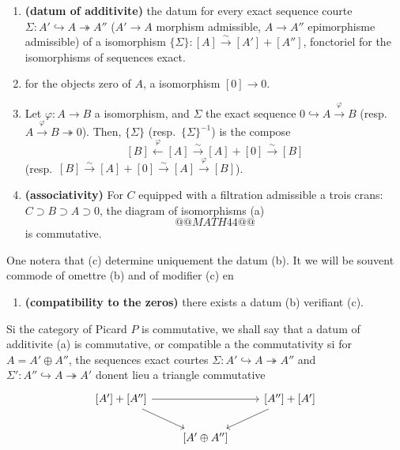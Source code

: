 \documentclass[12pt,a4paper]{article}
\theoremstyle{plain}
\theoremstyle{definition}
\begin{document}
\begin{enumerate}[label=(\alph*)]
\item \textbf{(datum of additivite)} the datum for every exact sequence courte $\Sigma: A' \hookrightarrow
A \twoheadrightarrow A''$ ($A' \to A$ morphism admissible, $A \to A''$ epimorphisme admissible) of a
isomorphism $\{\Sigma\}: [A] \xrightarrow{\sim} [A'] + [A'']$, fonctoriel for the isomorphisms of sequences
exact.

\item for the objects zero of $A$, a isomorphism $[0] \to 0$.

\item Let $\varphi: A \to B$ a isomorphism, and $\Sigma$ the exact sequence $0 \hookrightarrow A \xrightarrow{\varphi} B$ (resp.\ $A \xrightarrow{\varphi} B \twoheadrightarrow 0$). Then, $\{\Sigma\}$ (resp.\ $\{\Sigma\}^{-1}$) is the compose
\[
[B] \xleftarrow{\varphi} [A] \xrightarrow{\sim} [A] + [0] \xrightarrow{\sim} [B]
\]
(resp.\ $[B] \xrightarrow{\sim} [A] + [0] \xrightarrow{\sim} [A] \xrightarrow{\varphi} [B]$).

\item \textbf{(associativity)} For $C$ equipped with a filtration admissible a trois crans:
$C \supset B \supset A \supset 0$, the diagram of isomorphisms (a)
\[
@@MATH44@@
\]
is commutative.
\end{enumerate}

One notera that (c) determine uniquement the datum (b). It we will be souvent
commode of omettre (b) and of modifier (c) en

\begin{enumerate}[label=(c$'$)]
\item \textbf{(compatibility to the zeros)} there exists a datum (b) verifiant (c).
\end{enumerate}

Si the category of Picard $P$ is commutative, we shall say that a datum
of additivite (a) is commutative, or compatible a the commutativity si for $A =
A' \oplus A''$, the sequences exact courtes $\Sigma: A' \hookrightarrow A \twoheadrightarrow A''$ and $\Sigma': A'' \hookrightarrow A \twoheadrightarrow A'$
donent lieu a triangle commutative
\begin{equation}\label{eq:4.3.1}
\begin{tikzcd}
{[A']} + [A''] \arrow[dr] \arrow[rr] & & {[A''] + [A']} \arrow[dl] \\
& {[A' \oplus A'']} &
\end{tikzcd}
\end{equation}
\end{document}
